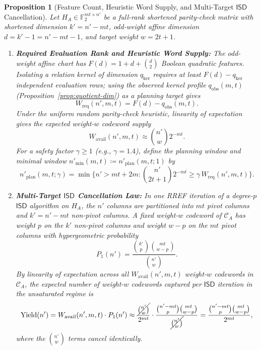 \documentclass[11pt,a4paper]{article}
\newtheorem{proposition}{Proposition}
\theoremstyle{definition}
\theoremstyle{remark}
\newcommand{\F}{\mathbb{F}}
\newcommand{\ISD}{\mathsf{ISD}}
\begin{document}
\begin{proposition}[Feature Count, Heuristic Word Supply, and Multi-Target $\ISD$ Cancellation]
\label{prop:isd-cancellation}
Let $H_A \in \F_2^{mt \times n'}$ be a full-rank shortened parity-check matrix with shortened dimension $k' = n' - mt$, odd-weight affine dimension $d = k' - 1 = n' - mt - 1$, and target weight $w = 2t + 1$.
\begin{enumerate}[leftmargin=2em]
    \item \textbf{Required Evaluation Rank and Heuristic Word Supply:}
    The odd-weight affine chart has $F(d) = 1 + d + \binom{d}{2}$ Boolean quadratic features. Isolating a relation kernel of dimension $q_{\ker}$ requires at least $F(d) - q_{\ker}$ independent evaluation rows; using the observed kernel profile $q_{\mathrm{obs}}(m, t)$ (Proposition~\ref{prop:quotient-dim}) as a planning target gives
    \begin{equation}
    \label{eq:w-req}
        W_{\text{req}}(n', m, t) = F(d) - q_{\mathrm{obs}}(m, t).
    \end{equation}
    Under the uniform random parity-check heuristic, linearity of expectation gives the expected weight-$w$ codeword supply
    \begin{equation}
    \label{eq:w-avail}
        W_{\text{avail}}(n', m, t) \approx \binom{n'}{w} 2^{-mt}.
    \end{equation}
    For a safety factor $\gamma \ge 1$ (e.g., $\gamma = 1.4$), define the planning window and minimal window $n'_{\min}(m, t) \coloneqq n'_{\mathrm{plan}}(m, t; 1)$ by
    \begin{equation}
    \label{eq:n-min-cond}
        n'_{\mathrm{plan}}(m, t; \gamma) = \min\!\Big\{n' > mt + 2m : \binom{n'}{2t+1} 2^{-mt} \ge \gamma\, W_{\text{req}}(n', m, t)\Big\}.
    \end{equation}
    \item \textbf{Multi-Target $\ISD$ Cancellation Law:}
    In one RREF iteration of a degree-$p$ $\ISD$ algorithm on $H_A$, the $n'$ columns are partitioned into $mt$ pivot columns and $k' = n' - mt$ non-pivot columns. A fixed weight-$w$ codeword of $\mathcal{C}_A$ has weight $p$ on the $k'$ non-pivot columns and weight $w - p$ on the $mt$ pivot columns with hypergeometric probability
    \begin{equation}
    \label{eq:p1-hyper}
        P_1(n') = \frac{\binom{k'}{p}\binom{mt}{w-p}}{\binom{n'}{w}}.
    \end{equation}
    By linearity of expectation across all $W_{\text{avail}}(n', m, t)$ weight-$w$ codewords in $\mathcal{C}_A$, the expected number of weight-$w$ codewords captured per $\ISD$ iteration in the unsaturated regime is
    \begin{equation}
    \label{eq:yield-cancellation}
        \operatorname{Yield}(n') = W_{\text{avail}}(n', m, t) \cdot P_1(n')
        \approx \frac{\cancel{\binom{n'}{w}}}{2^{mt}} \cdot \frac{\binom{n'-mt}{p}\binom{mt}{w-p}}{\cancel{\binom{n'}{w}}}
        = \frac{\binom{n'-mt}{p}\binom{mt}{w-p}}{2^{mt}},
    \end{equation}
    where the $\binom{n'}{w}$ terms cancel identically.
\end{enumerate}
\end{proposition}
\end{document}

